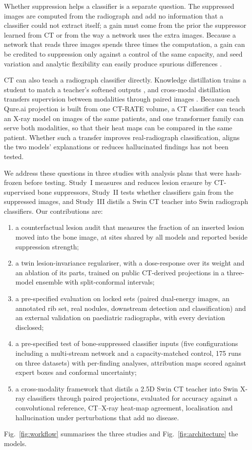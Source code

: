 Whether suppression helps a classifier is a separate question. The suppressed images are computed from the radiograph and add no
information that a classifier could not extract itself; a gain must come from the prior the suppressor learned from CT or from the way a
network uses the extra images. Because a network that reads three images spends three times the computation, a gain can be credited to
suppression only against a control of the same capacity, and seed variation and analytic flexibility can easily produce spurious
differences \citep{varoquaux2022failures,simmons2011falsepositive}.

CT can also teach a radiograph classifier directly. Knowledge distillation trains a student to match a teacher's softened outputs
\citep{hinton2015distilling}, and cross-modal distillation transfers supervision between modalities through paired images
\citep{gupta2016crossmodal}. Because each Qure.ai projection is built from one CT-RATE volume, a CT classifier can teach an X-ray model on
images of the same patients, and one transformer family \citep{liu2022swinv2} can serve both modalities, so that their heat maps can be
compared in the same patient. Whether such a transfer improves real-radiograph classification, aligns the two models' explanations or
reduces hallucinated findings has not been tested.

We address these questions in three studies with analysis plans that were hash-frozen before testing. Study~I measures and reduces lesion
erasure by CT-supervised bone suppressors, Study~II tests whether classifiers gain from the suppressed images, and Study~III distils a Swin
CT teacher into Swin radiograph classifiers. Our contributions are:
\begin{enumerate}
\item a counterfactual lesion audit that measures the fraction of an inserted lesion moved into the bone image, at sites shared by all
 models and reported beside suppression strength;
\item a twin lesion-invariance regulariser, with a dose-response over its weight and an ablation of its parts, trained on public
 CT-derived projections in a three-model ensemble with split-conformal intervals;
\item a pre-specified evaluation on locked sets (paired dual-energy images, an annotated rib set, real nodules, downstream detection and
 classification) and an external validation on paediatric radiographs, with every deviation disclosed;
\item a pre-specified test of bone-suppressed classifier inputs (five configurations including a multi-stream network and a
 capacity-matched control, 175 runs on three datasets) with per-finding analyses, attribution maps scored against expert boxes and
 conformal uncertainty;
\item a cross-modality framework that distils a 2.5D Swin CT teacher into Swin X-ray classifiers through paired projections, evaluated for
 accuracy against a convolutional reference, CT--X-ray heat-map agreement, localisation and hallucination under perturbations that add no
 disease.
\end{enumerate}
Fig.~\ref{fig:workflow} summarises the three studies and Fig.~\ref{fig:architecture} the models.

